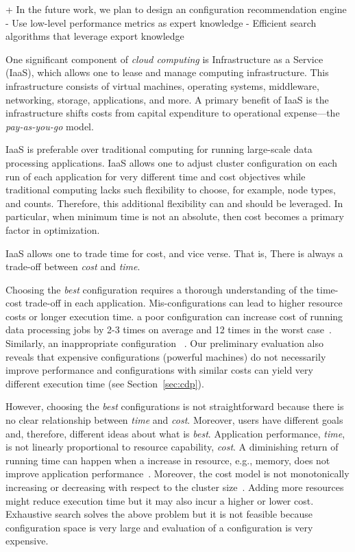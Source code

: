 + In the future work, we plan to design an configuration recommendation
  engine
  - Use low-level performance metrics as expert knowledge
  - Efficient search algorithms that leverage export knowledge

\fi


One significant component of \emph{cloud computing} is
Infrastructure as a Service (IaaS), which allows one to lease and
manage computing infrastructure.
This infrastructure consists of virtual machines, operating systems,
middleware, networking, storage, applications, and more.
A primary benefit of IaaS is the infrastructure shifts costs from
capital expenditure to operational expense---the
\emph{pay-as-you-go} model.

IaaS is preferable over traditional computing for running
large-scale data processing applications.
IaaS allows one to adjust cluster configuration on each run of each application
for very different time and cost objectives
while traditional computing lacks such flexibility
to choose, for example, node types, and counts.
Therefore, this additional flexibility can and should be leveraged.
In particular, when minimum time is not an absolute, then cost becomes
a primary factor in optimization.

IaaS allows one to trade time for cost, and vice verse.
That is, 
There is always a trade-off between \emph{cost} and \emph{time}.

Choosing the \emph{best} configuration requires a thorough understanding
of the time-cost trade-off in each application.
Mis-configurations can lead to higher resource costs or longer execution time.
a poor configuration can increase cost of running data processing jobs
by 2-3 times on average and 12 times in the worst case~\cite{Alipourfard2017}.
Similarly, an inappropriate configuration 
~\cite{Venkataraman2016}.
Our preliminary evaluation also reveals that
expensive configurations (powerful machines) do not necessarily
improve performance
and
configurations with similar costs can yield very different execution time
(see Section~\ref{sec:cdp}).

However, choosing the \emph{best} configurations is not straightforward
because there is no clear relationship between \emph{time} and \emph{cost}.
Moreover, users have different goals and, therefore, different ideas about
what is \emph{best}.
Application performance, \emph{time}, is not linearly proportional to
resource capability, \emph{cost}.
A diminishing return of running time can happen when a increase in resource,
e.g., memory, does not improve application performance~\cite{Alipourfard2017}.
Moreover, the cost model is not monotonically increasing or decreasing
with respect to the cluster size~\cite{Alipourfard2017}.
Adding more resources might reduce execution time but it may also incur
a higher or lower cost.
Exhaustive search solves the above problem but it is not feasible because
configuration space is very large and
evaluation of a configuration is very expensive.

